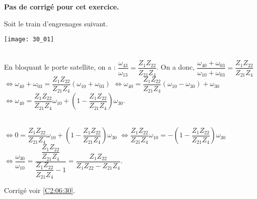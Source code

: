 \normaltrue \difficilefalse \tdifficilefalse
\correctiontrue


\setcounter{numques}{0}
\ifcorrection
\else
\textbf{Pas de corrigé pour cet exercice.}
\fi

\ifprof
\else
Soit le train d'engrenages suivant. 
\begin{center}
\texttt{[image: 30\_01]}
\end{center}
\fi


\ifprof
\else
\fi

\ifprof ~\\
 En bloquant le porte satellite, on a : $\dfrac{\omega_{43}}{\omega_{13}}=\dfrac{Z_{1}Z_{22}}{Z_{21}Z_{4}}$.
  On a donc, 
  $\dfrac{\omega_{40}+\omega_{03}}{\omega_{10}+\omega_{03}}=
\dfrac{Z_{1}Z_{22}}{Z_{21}Z_{4}}$
  $\Leftrightarrow \omega_{40}+\omega_{03}=\dfrac{Z_{1}Z_{22}}{Z_{21}Z_{4}}\left( \omega_{10}+\omega_{03} \right)$
  $\Leftrightarrow \omega_{40}=\dfrac{Z_{1}Z_{22}}{Z_{21}Z_{4}}\left( \omega_{10}-\omega_{30} \right) + \omega_{30}$
 $\Leftrightarrow \omega_{40}=\dfrac{Z_{1}Z_{22}}{Z_{21}Z_{4}}\omega_{10} +\left(1- \dfrac{Z_{1}Z_{22}}{Z_{21}Z_{4}}\right)\omega_{30}$.
\else
\fi

\ifprof~\\
$\Leftrightarrow 0=\dfrac{Z_{1}Z_{22}}{Z_{21}Z_{4}}\omega_{10} +\left(1- \dfrac{Z_{1}Z_{22}}{Z_{21}Z_{4}}\right)\omega_{30}$
$\Leftrightarrow  \dfrac{Z_{1}Z_{22}}{Z_{21}Z_{4}}\omega_{10} =-\left(1- \dfrac{Z_{1}Z_{22}}{Z_{21}Z_{4}}\right)\omega_{30}$
$\Leftrightarrow  \dfrac{\omega_{30}}{\omega_{10}} = \dfrac{ \dfrac{Z_{1}Z_{22}}{Z_{21}Z_{4}}}{ \dfrac{Z_{1}Z_{22}}{Z_{21}Z_{4}}-1}= \dfrac{ {Z_{1}Z_{22}}}{ {Z_{1}Z_{22}}-Z_{21}Z_{4}}$.
\else
\fi

\ifprof
\else
\begin{flushright}
\footnotesize{Corrigé  voir \ref{C2:06:30}.}
\end{flushright}%
\fi